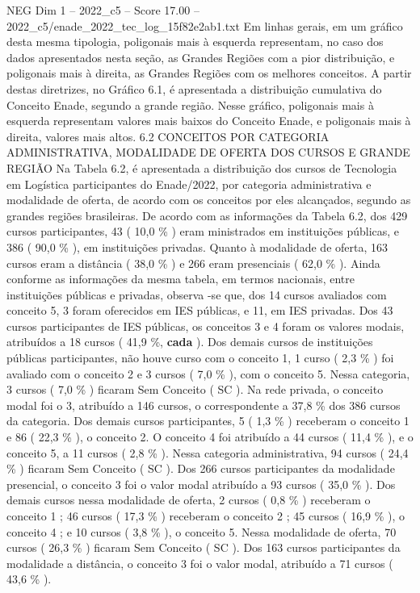 \begin{textsample}{NEG Dim 1 – 2022\_c5 – Score 17.00 – 2022\_c5/enade\_2022\_tec\_log\_15f82e2ab1.txt}
Em linhas gerais, em um gráfico desta mesma tipologia, poligonais mais à esquerda representam, no caso dos dados apresentados nesta seção, as Grandes Regiões com a pior distribuição, e poligonais mais à direita, as Grandes Regiões com os melhores conceitos.
A partir destas diretrizes, no Gráfico 6.1, é apresentada a distribuição cumulativa do Conceito Enade, segundo a grande região.
Nesse gráfico, poligonais mais à esquerda representam valores mais baixos do Conceito Enade, e poligonais mais à direita, valores mais altos. 6.2 CONCEITOS POR CATEGORIA ADMINISTRATIVA, MODALIDADE DE OFERTA DOS CURSOS E GRANDE REGIÃO Na Tabela 6.2, é apresentada a distribuição dos cursos de Tecnologia em Logística participantes do Enade/2022, por categoria administrativa e modalidade de oferta, de acordo com os conceitos por eles alcançados, segundo as grandes regiões brasileiras.
De acordo com as informações da Tabela 6.2, dos 429 cursos participantes, 43 ( 10,0 \% ) eram ministrados em instituições públicas, e 386 ( 90,0 \% ), em instituições privadas.
Quanto à modalidade de oferta, 163 cursos eram a distância ( 38,0 \% ) e 266 eram presenciais ( 62,0 \% ).
Ainda conforme as informações da mesma tabela, em termos nacionais, entre instituições públicas e privadas, observa -se que, dos 14 cursos avaliados com conceito 5, 3 foram oferecidos em IES públicas, e 11, em IES privadas.
Dos 43 cursos participantes de IES públicas, os conceitos 3 e 4 foram os valores modais, atribuídos a 18 cursos ( 41,9 \%, \textbf{cada} ).
Dos demais cursos de instituições públicas participantes, não houve curso com o conceito 1, 1 curso ( 2,3 \% ) foi avaliado com o conceito 2 e 3 cursos ( 7,0 \% ), com o conceito 5.
Nessa categoria, 3 cursos ( 7,0 \% ) ficaram Sem Conceito ( SC ).
Na rede privada, o conceito modal foi o 3, atribuído a 146 cursos, o correspondente a 37,8 \% dos 386 cursos da categoria.
Dos demais cursos participantes, 5 ( 1,3 \% ) receberam o conceito 1 e 86 ( 22,3 \% ), o conceito 2.
O conceito 4 foi atribuído a 44 cursos ( 11,4 \% ), e o conceito 5, a 11 cursos ( 2,8 \% ).
Nessa categoria administrativa, 94 cursos ( 24,4 \% ) ficaram Sem Conceito ( SC ).
Dos 266 cursos participantes da modalidade presencial, o conceito 3 foi o valor modal atribuído a 93 cursos ( 35,0 \% ).
Dos demais cursos nessa modalidade de oferta, 2 cursos ( 0,8 \% ) receberam o conceito 1 ; 46 cursos ( 17,3 \% ) receberam o conceito 2 ; 45 cursos ( 16,9 \% ), o conceito 4 ; e 10 cursos ( 3,8 \% ), o conceito 5.
Nessa modalidade de oferta, 70 cursos ( 26,3 \% ) ficaram Sem Conceito ( SC ).
Dos 163 cursos participantes da modalidade a distância, o conceito 3 foi o valor modal, atribuído a 71 cursos ( 43,6 \% ).

\end{textsample}
